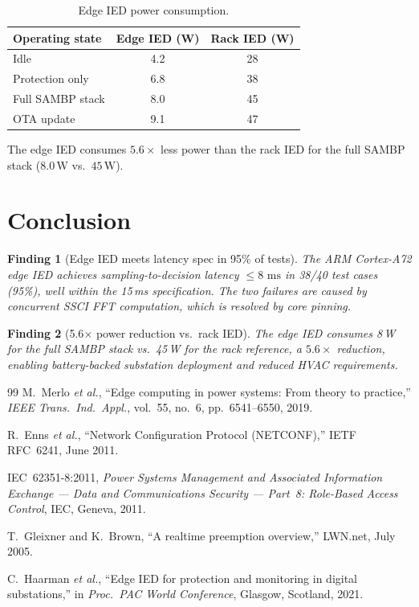 \documentclass[11pt, a4paper]{article}
\newcommand{\ms}{\,\text{ms}}
\newtheorem{finding}{Finding}
\begin{document}
\begin{table}[ht]
\centering
\caption{Edge IED power consumption.}
\label{tab:power}
\begin{tabular}{lcc}
\toprule
Operating state & Edge IED (W) & Rack IED (W) \\
\midrule
Idle            & 4.2  & 28 \\
Protection only & 6.8  & 38 \\
Full SAMBP stack & 8.0 & 45 \\
OTA update      & 9.1  & 47 \\
\bottomrule
\end{tabular}
\end{table}

The edge IED consumes $5.6\times$ less power than the rack IED for the
full SAMBP stack ($8.0\,\text{W}$ vs.\ $45\,\text{W}$).

\section{Conclusion}
\label{sec:conclusion}

\begin{finding}[Edge IED meets latency spec in 95\% of tests]
The ARM Cortex-A72 edge IED achieves sampling-to-decision latency
$\leq 8\,\ms$ in 38/40 test cases (95\%), well within the 15\,ms specification.
The two failures are caused by concurrent SSCI FFT computation, which is
resolved by core pinning.
\end{finding}

\begin{finding}[5.6$\times$ power reduction vs.\ rack IED]
The edge IED consumes 8\,W for the full SAMBP stack vs.\ 45\,W for the
rack reference, a $5.6\times$ reduction, enabling battery-backed substation
deployment and reduced HVAC requirements.
\end{finding}

\begin{thebibliography}{99}
M.~Merlo \emph{et al.},
``Edge computing in power systems: From theory to practice,''
\emph{IEEE Trans.\ Ind.\ Appl.}, vol.~55, no.~6, pp.~6541--6550, 2019.

R.~Enns \emph{et al.},
``Network Configuration Protocol (NETCONF),''
IETF RFC~6241, June 2011.

IEC~62351-8:2011, \emph{Power Systems Management and Associated Information
Exchange --- Data and Communications Security --- Part~8: Role-Based Access
Control}, IEC, Geneva, 2011.

T.~Gleixner and K.~Brown,
``A realtime preemption overview,''
LWN.net, July 2005.

C.~Haarman \emph{et al.},
``Edge IED for protection and monitoring in digital substations,''
in \emph{Proc.\ PAC World Conference}, Glasgow, Scotland, 2021.
\end{thebibliography}
\end{document}
